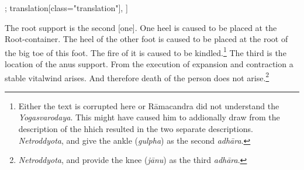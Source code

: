 \begin{alignment}[
  texts=edition[class="edition"];
  translation[class="translation"],
  ]
\begin{translation}
\begin{tlate}
      The root support is the second [one]. \textsuperscript{\coro{[\lowroman{5}]}} One heel is caused to be placed at the Root-container. The heel of the other foot is caused to be placed at the root of the big toe of this foot. The fire of it is caused to be kindled.\footnote{Either the text is corrupted here or Rāmacandra did not understand the \textit{Yogasvarodaya}. This might have caused him to addionally draw from the description of the  hhich resulted in the two separate descriptions. \textit{Netroddyota},  and  give the ankle (\textit{gulpha}) as the second \textit{adhāra}.}  
      The third is the location of the anus support. From the execution of expansion and contraction a stable vitalwind arises.\textsuperscript{\coro{[\lowroman{10}]}} And therefore death of the person does not arise.\footnote{\textit{Netroddyota},  and  provide the knee (\textit{jānu}) as the third \textit{adhāra}.} 
    \end{tlate}
  \end{translation}
\end{alignment}
\ekdpb*{}
